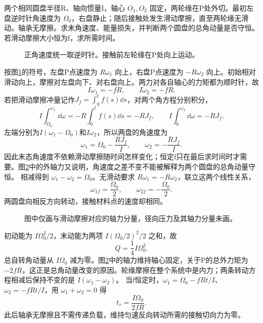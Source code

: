 \begin{exercise}[两个固定轴圆盘的摩擦传动]\label{deep6:problem-exercise-8}\label{deep6:ex:d5-h8}
两个相同圆盘半径R、轴向惯量I，轴心 $O_1,O_2$ 固定，两轮缘在P处外切。最初左盘逆时针角速度为 $\Omega_0$，右盘静止；随后接触处发生滑动摩擦，直至两轮缘无滑动。轴承无摩擦。求末角速度、能量损失，并判断两个圆盘的总角动量是否守恒。若滑动摩擦大小恒为f，求所需时间。
\end{exercise}
\begin{figure}[H]\centering
{}
\caption{正角速度统一取逆时针。接触前左轮缘在P处向上运动。}\label{deep6:fig:d5-h8-q}
\end{figure}
\begin{solution}
按图\ref{deep6:fig:d5-h8-q}的符号，左盘P点速度为 $R\omega_1$ 向上，右盘P点速度为 $-R\omega_2$ 向上。初始相对滑动向上，摩擦对左盘向下、对右盘向上。两力对各自轴心的力矩都为顺时针，故
\[
I\dot\omega_1=-fR,\qquad I\dot\omega_2=-fR.
\]
若把滑动摩擦冲量记作$J_f=\int_0^t f(s)\dd s$，对两个角方程分别积分，
\[
I\int_{\Omega_0}^{\omega_1}\dd\omega
=-R\int_0^tf(s)\dd s=-RJ_f,\qquad
I\int_0^{\omega_2}\dd\omega=-RJ_f.
\]
左端分别为$I(\omega_1-\Omega_0)$和$I\omega_2$，所以两盘的角速度为
\[
\omega_1=\Omega_0-\frac{RJ_f}{I},\qquad
\omega_2=-\frac{RJ_f}{I}.
\]
因此末态角速度不依赖滑动摩擦随时间怎样变化；恒定f只在最后求时间时才需要。图\ref{deep6:fig:d5-h8-s}中的外轴力又说明，角速度之差不变不能被解释为两个圆盘的总角动量守恒。
相减得到 $\omega_1-\omega_2=\Omega_0$。无滑动要求 $R\omega_1=-R\omega_2$，联立这两个线性关系，
\[
\omega_{1f}=\frac{\Omega_0}2,
\qquad \omega_{2f}=-\frac{\Omega_0}2.
\]
两圆盘向相反方向转动，接触材料点的速度却相同。
\begin{figure}[H]\centering
{}
\caption{图中仅画与滑动摩擦对应的轴力分量，径向压力及其轴力分量未画。}\label{deep6:fig:d5-h8-s}
\end{figure}
初动能为 $I\Omega_0^2/2$，末动能为两项 $I(\Omega_0/2)^2/2$ 之和，故
\[
Q=\frac14I\Omega_0^2.
\]
总自转角动量从 $I\Omega_0$ 减为零。图\ref{deep6:fig:d5-h8-s}中的轴力维持轴心固定，关于P的总外力矩为 $-2fR$，这正是总角动量改变的原因。轮缘摩擦在整个系统中是内力；两条转动方程相减后保持不变的是 $I(\omega_1-\omega_2)$。
当f恒定时，$\omega_1=\Omega_0-fRt/I$、$\omega_2=-fRt/I$，用 $\omega_1+\omega_2=0$ 得
\[
t_r=\frac{I\Omega_0}{2fR}.
\]
此后轴承无摩擦且不需传递负载，维持匀速反向转动所需的接触切向力为零。
\end{solution}


